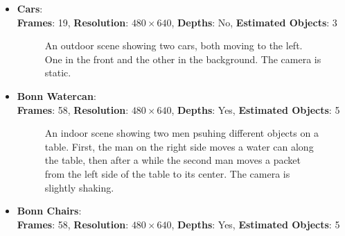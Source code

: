 \begin{itemize}
\item \textbf{Cars}: \\ 
\textbf{Frames}: 19, \textbf{Resolution}: $480 \times 640$, \textbf{Depths}: No, \textbf{Estimated Objects}: 3
\begin{figure}[H]
\begin{center}
\end{center}
\caption[Dataset Bonn Cars]{An outdoor scene showing two cars, both moving to the left. One in the front and the other in the background. The camera is static.}
\label{fig:eval_datasets_cars}
\end{figure}
\item \textbf{Bonn Watercan}: \\
\textbf{Frames}: 58, \textbf{Resolution}: $480 \times 640$, \textbf{Depths}: Yes, \textbf{Estimated Objects}: 5
\begin{figure}[H]
\begin{center}
\end{center}
\caption[Dataset Bonn Watercan]{An indoor scene showing two men psuhing different objects on a table. First, the man on the right side moves a water can along the table, then after a while the second man moves a packet from the left side of the table to its center. The camera is slightly shaking.}
\label{fig:eval_datasets_bonn_watercan}
\end{figure}
\item \textbf{Bonn Chairs}: \\
\textbf{Frames}: 58, \textbf{Resolution}: $480 \times 640$, \textbf{Depths}: Yes, \textbf{Estimated Objects}: 5
\begin{figure}[H]
\begin{center}

\end{center}
\end{figure}
\end{itemize}
